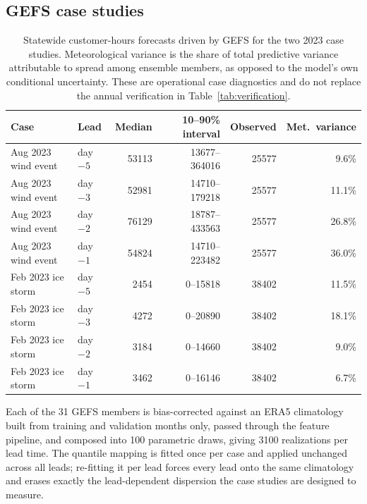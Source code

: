 \documentclass[10pt,twocolumn,letterpaper]{article}
\newcommand{\CH}{customer-hours}
\begin{document}
\subsection{GEFS case studies}

\begin{table}[!tb]
\centering
\caption{Statewide \CH{} forecasts driven by GEFS for the two 2023 case
studies. Meteorological variance is the share of total predictive variance
attributable to spread among ensemble members, as opposed to the model's own
conditional uncertainty. These are operational case diagnostics and do not
replace the annual verification in Table~\ref{tab:verification}.}
\label{tab:gefs}
\small
\begin{tabular*}{\textwidth}{@{\extracolsep{\fill}}llrrrr@{}}
\toprule
\textbf{Case} & \textbf{Lead} & \textbf{Median} & \textbf{10--90\% interval} & \textbf{Observed} & \textbf{Met.\ variance} \\
\midrule
Aug 2023 wind event & day $-5$ & \num{53113} & \num{13677}--\num{364016} & \num{25577} & 9.6\% \\
Aug 2023 wind event & day $-3$ & \num{52981} & \num{14710}--\num{179218} & \num{25577} & 11.1\% \\
Aug 2023 wind event & day $-2$ & \num{76129} & \num{18787}--\num{433563} & \num{25577} & 26.8\% \\
Aug 2023 wind event & day $-1$ & \num{54824} & \num{14710}--\num{223482} & \num{25577} & 36.0\% \\
\addlinespace
Feb 2023 ice storm  & day $-5$ & \num{2454} & \num{0}--\num{15818} & \num{38402} & 11.5\% \\
Feb 2023 ice storm  & day $-3$ & \num{4272} & \num{0}--\num{20890} & \num{38402} & 18.1\% \\
Feb 2023 ice storm  & day $-2$ & \num{3184} & \num{0}--\num{14660} & \num{38402} & 9.0\% \\
Feb 2023 ice storm  & day $-1$ & \num{3462} & \num{0}--\num{16146} & \num{38402} & 6.7\% \\
\bottomrule
\end{tabular*}
\end{table}

Each of the 31 GEFS members is bias-corrected against an ERA5 climatology built
from training and validation months only, passed through the feature pipeline,
and composed into 100 parametric draws, giving 3100 realizations per lead time.
The quantile mapping is fitted once per case and applied unchanged across all
leads; re-fitting it per lead forces every lead onto the same climatology and
erases exactly the lead-dependent dispersion the case studies are designed to
measure.
\end{document}

